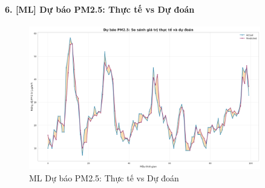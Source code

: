 \documentclass[12pt,a4paper]{article}
\begin{document}
\paragraph{6. [ML] Dự báo PM2.5: Thực tế vs Dự đoán}

\begin{figure}[H]
\centering
\includegraphics[width=0.9\textwidth]{results_comb_PM25_Hanoi_2018_sm_20251011_121424/20251011_121424_ml_predicted_vs_actual.png}
\caption{ML Dự báo PM2.5: Thực tế vs Dự đoán}
\end{figure}
\end{document}
